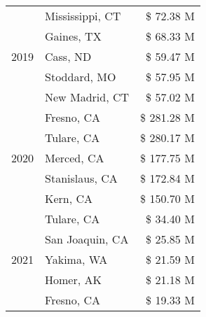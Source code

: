 \begin{longtable}{llr}
\cline{1-3}
\multirow[t]{5}{*}{2019} & Mississippi, CT & \$ 72.38 M \\
 & Gaines, TX & \$ 68.33 M \\
 & Cass, ND & \$ 59.47 M \\
 & Stoddard, MO & \$ 57.95 M \\
 & New Madrid, CT & \$ 57.02 M \\
\cline{1-3}
\multirow[t]{5}{*}{2020} & Fresno, CA & \$ 281.28 M \\
 & Tulare, CA & \$ 280.17 M \\
 & Merced, CA & \$ 177.75 M \\
 & Stanislaus, CA & \$ 172.84 M \\
 & Kern, CA & \$ 150.70 M \\
\cline{1-3}
\multirow[t]{5}{*}{2021} & Tulare, CA & \$ 34.40 M \\
 & San Joaquin, CA & \$ 25.85 M \\
 & Yakima, WA & \$ 21.59 M \\
 & Homer, AK & \$ 21.18 M \\
 & Fresno, CA & \$ 19.33 M \\
\cline{1-3}
\bottomrule
\end{longtable}
